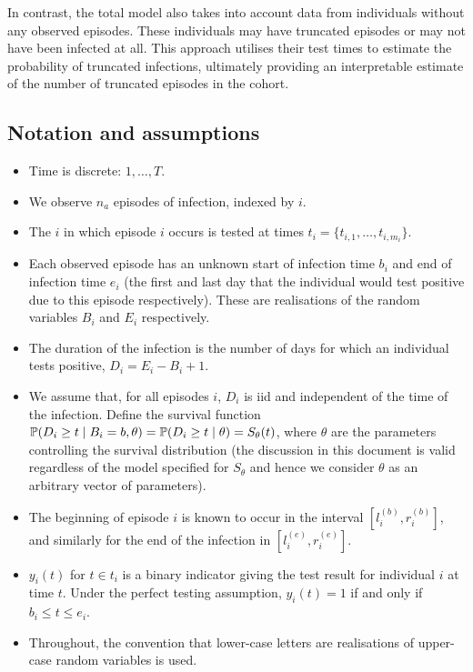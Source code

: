 \documentclass[thesis.tex]{subfiles}
\begin{document}
In contrast, the total model also takes into account data from individuals without any observed episodes.
These individuals may have truncated episodes or may not have been infected at all. This approach utilises their test times to estimate the probability of truncated infections, ultimately providing an interpretable estimate of the number of truncated episodes in the cohort.

\subsection{Notation and assumptions}
\begin{itemize}
\item
  Time is discrete: $1, \dots, T$.
\item
  We observe $n_a$ episodes of infection, indexed by $i$.
\item
  The $i$ in which episode $i$ occurs is tested at times
  $t_i = \{ t_{i,1}, \dots, t_{i,m_i} \}$.
\item
  Each observed episode has an unknown start of infection time $b_i$
  and end of infection time $e_i$ (the first and last day that the
  individual would test positive due to this episode respectively).
  These are realisations of the random variables $B_i$ and $E_i$
  respectively.
\item
  The duration of the infection is the number of days for which an
  individual tests positive, $D_i = E_i - B_i + 1$.
\item
  We assume that, for all episodes $i$, $D_i$ is iid and independent
  of the time of the infection. Define the survival function
  $\operatorname{\mathbb{P}}(D_i \geq t \mid B_i = b, \theta) = \operatorname{\mathbb{P}}(D_i \geq t \mid \theta) = S_\theta(t)$,
  where $\theta$ are the parameters controlling the survival
  distribution (the discussion in this document is valid regardless of
  the model specified for $S_\theta$ and hence we consider $\theta$
  as an arbitrary vector of parameters).
\item
  The beginning of episode $i$ is known to occur in the interval
  $[l_i^{(b)}, r_i^{(b)}]$, and similarly for the end of the infection
  in $[l_i^{(e)}, r_i^{(e)}]$.
\item
  $y_i(t)$ for $t \in t_i$ is a binary indicator giving the test
  result for individual $i$ at time $t$. Under the perfect testing
  assumption, $y_i(t) = 1$ if and only if $b_i \leq t \leq e_i$.
\item
  Throughout, the convention that lower-case letters are realisations of
  upper-case random variables is used.
\end{itemize}
\end{document}
